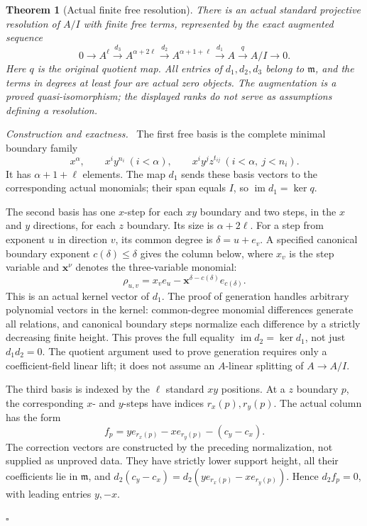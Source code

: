 \documentclass[11pt,a4paper]{article}
\newtheorem{theorem}{Theorem}[section]
\newenvironment{proof}[1][Proof]{\par\noindent\textit{#1.}\ \ignorespaces}{\unskip\nobreak\hfill\ensuremath{\square}\par}
\begin{document}
\begin{theorem}[Actual finite free resolution]\label{thm:resolution}
There is an actual standard projective resolution of $A/I$ with finite free
terms, represented by the exact augmented sequence
\[
 0\longrightarrow A^{\ell}\xrightarrow{d_3}
 A^{\alpha+2\ell}\xrightarrow{d_2}
 A^{\alpha+1+\ell}\xrightarrow{d_1}A
 \xrightarrow{q}A/I\longrightarrow0.
\]
Here $q$ is the original quotient map. All entries of $d_1,d_2,d_3$ belong to
$\mathfrak m$, and the terms in degrees at least four are actual zero objects.
The augmentation is a proved quasi-isomorphism; the displayed ranks do not
serve as assumptions defining a resolution.
\end{theorem}
\begin{proof}[Construction and exactness]
The first free basis is the complete minimal boundary family
\[
 x^{\alpha},\qquad x^iy^{n_i}\ (i<\alpha),\qquad
 x^iy^jz^{t_{ij}}\ (i<\alpha,\ j<n_i).
\]
It has $\alpha+1+\ell$ elements. The map $d_1$ sends these basis vectors to
the corresponding actual monomials; their span equals $I$, so
$\operatorname{im}d_1=\ker q$.

The second basis has one $x$-step for each $xy$ boundary and two steps,
in the $x$ and $y$ directions, for each $z$ boundary. Its size is
$\alpha+2\ell$. For a step from exponent $u$ in direction $v$, its common
degree is $\delta=u+e_v$. A specified canonical boundary exponent
$c(\delta)\le\delta$ gives the column below, where $x_v$ is the step variable and $\mathbf{x}^{\nu}$ denotes the three-variable monomial:
\[
 \rho_{u,v}=x_v e_u-\mathbf{x}^{\delta-c(\delta)}e_{c(\delta)}.
\]
This is an actual kernel vector of $d_1$. The proof of generation handles
arbitrary polynomial vectors in the kernel: common-degree monomial
differences generate all relations, and canonical boundary steps normalize
each difference by a strictly decreasing finite height. This proves the
full equality $\operatorname{im}d_2=\ker d_1$, not just $d_1d_2=0$.
The quotient argument used to prove generation requires only a
coefficient-field linear lift; it does not assume an $A$-linear splitting
of $A\to A/I$.

The third basis is indexed by the $\ell$ standard $xy$ positions. At a
$z$ boundary $p$, the corresponding $x$- and $y$-steps have indices
$r_x(p),r_y(p)$. The actual column has the form
\[
 f_p=y e_{r_x(p)}-x e_{r_y(p)}-(c_y-c_x).
\]
The correction vectors are constructed by the preceding normalization,
not supplied as unproved data. They have strictly lower support height,
all their coefficients lie in $\mathfrak m$, and
$d_2(c_y-c_x)=d_2(y e_{r_x(p)}-x e_{r_y(p)})$.
Hence $d_2f_p=0$, with leading entries $y,-x$.


\end{proof}
\end{document}
